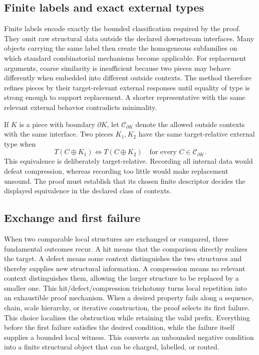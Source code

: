 \documentclass[11pt]{article}
\begin{document}
\subsection{Finite labels and exact external types}
Finite labels encode exactly the bounded classification required by the proof. They omit raw structural data outside the declared downstream interfaces.
Many objects carrying the same label then create the homogeneous subfamilies on which standard combinatorial mechanisms become applicable.
For replacement arguments, coarse similarity is insufficient because two pieces may behave differently when embedded into different outside contexts.
The method therefore refines pieces by their target-relevant external responses until equality of type is strong enough to support replacement.
A shorter representative with the same relevant external behavior contradicts minimality.

If \(K\) is a piece with boundary \(\partial K\), let \(\mathcal C_{\partial K}\)
denote the allowed outside contexts with the same interface. Two pieces
\(K_1,K_2\) have the same target-relative external type when
\[
  T(C\oplus K_1)\Longleftrightarrow T(C\oplus K_2)
  \quad\text{for every }C\in\mathcal C_{\partial K}.
\]
This equivalence is deliberately target-relative. Recording all internal data
would defeat compression, whereas recording too little would make replacement
unsound. The proof must establish that its chosen finite descriptor decides
the displayed equivalence in the declared class of contexts.
\subsection{Exchange and first failure}
When two comparable local structures are exchanged or compared, three fundamental outcomes recur.
A hit means that the comparison directly realizes the target.
A defect means some context distinguishes the two structures and thereby supplies new structural information.
A compression means no relevant context distinguishes them, allowing the larger structure to be replaced by a smaller one.
This hit/defect/compression trichotomy turns local repetition into an exhaustible proof mechanism.
When a desired property fails along a sequence, chain, scale hierarchy, or iterative construction, the proof selects its first failure. This choice localizes the obstruction while retaining the valid prefix.
Everything before the first failure satisfies the desired condition, while the failure itself supplies a bounded local witness.
This converts an unbounded negative condition into a finite structural object that can be charged, labelled, or routed.
\end{document}
